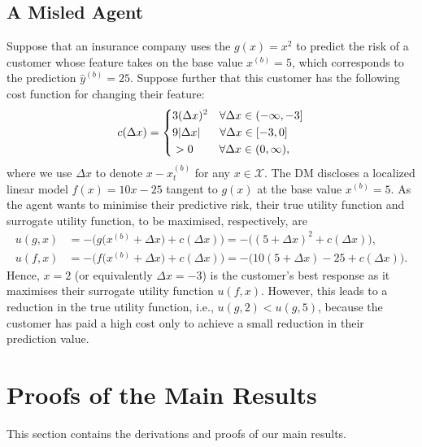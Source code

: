 \subsection{A Misled Agent}\label{apx:misled-agent-example}
\begin{example}
Suppose that an insurance company uses the $g(x)=x^2$ to predict the risk of a customer whose feature takes on the base value $x^{(b)}=5$, which corresponds to the prediction $\hat{y}^{(b)}=25$. Suppose further that this customer has the following cost function for changing their feature:
\begin{align*}
c(\Delta x) = 
\left\{\begin{aligned}
&3(\Delta x)^2 \quad \forall \Delta x\in (-\infty,-3]\\
&9|\Delta x| \hspace{6mm} \forall \Delta x\in[-3,0]\\
&>0 \hspace{8mm} \forall \Delta x\in(0,\infty),
\end{aligned}\right.
\end{align*}
where we use $\Delta x$ to denote $x - x_t^{(b)}$ for any $x\in\mathcal{X}$.
The DM discloses a localized linear model $f(x)=10x-25$ tangent to $g(x)$ at the base value $x^{(b)}=5$. As the agent wants to minimise their predictive risk, their true utility function and surrogate utility function, to be maximised, respectively, are
\begin{align*}
u(g,x) &= -\Big(g\big(x^{(b)}+\Delta x\big)+c(\Delta x)\Big) 
= -\big((5+\Delta x)^2 + c(\Delta x)\big),
\\
u(f,x) &= -\Big(f\big(x^{(b)}+\Delta x\big)+c(\Delta x)\Big)
= -\big(10(5+\Delta x)-25 + c(\Delta x)\big).
\end{align*}
Hence, $x=2$ (or equivalently $\Delta x=-3$) is the customer's best response as it maximises their surrogate utility function $u(f,x)$. However, this leads to a reduction in the true utility function, i.e., $u(g,2) < u(g,5)$, because the customer has paid a high cost only to achieve a small reduction in their prediction value.
\end{example}



\section{Proofs of the Main Results}\label{apx:proofs}

This section contains the derivations and proofs of our main results. 

